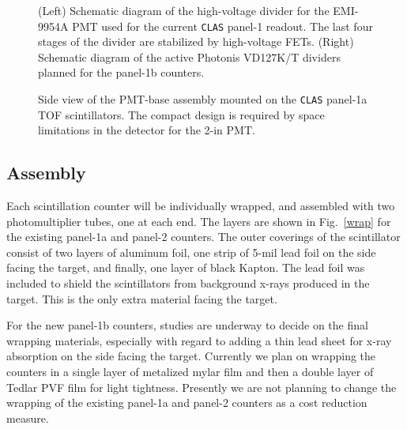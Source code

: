 \begin{figure}[htbp]
\vspace{9.5cm}
\caption{\small{(Left) Schematic diagram of the high-voltage divider for the 
EMI-9954A PMT used for the current {\tt CLAS} panel-1 readout.  The last four 
stages of the divider are stabilized by high-voltage FETs.  (Right) Schematic
diagram of the active Photonis VD127K/T dividers planned for the panel-1b 
counters.}}
\label{divider}
\end{figure}

\begin{figure}[htbp]
\vspace{5.2cm}
\caption{\small{Side view of the PMT-base assembly mounted on the {\tt CLAS}
panel-1a TOF scintillators.  The compact design is required by space 
limitations in the detector for the 2-in PMT.}}
\label{tube_base}
\end{figure}

\subsection{Assembly}

Each scintillation counter will be individually wrapped, and assembled with
two photomultiplier tubes, one at each end.  The layers are shown in 
Fig.~\ref{wrap} for the existing panel-1a and panel-2 counters.  The outer 
coverings of the scintillator consist of two layers of aluminum foil, one 
strip of 5-mil lead foil on the side facing the target, and finally, one 
layer of black Kapton.  The lead foil was included to shield the scintillators 
from background x-rays produced in the target.  This is the only extra 
material facing the target.

For the new panel-1b counters, studies are underway to decide on the final
wrapping materials, especially with regard to adding a thin lead sheet for
x-ray absorption on the side facing the target.  Currently we plan on
wrapping the counters in a single layer of metalized mylar film and then
a double layer of Tedlar PVF film for light tightness.  Presently we are not 
planning to change the wrapping of the existing panel-1a and panel-2 counters 
as a cost reduction measure.

